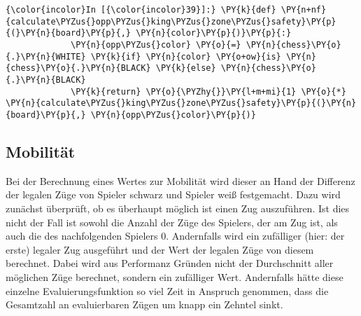     \begin{Verbatim}[commandchars=\\\{\}]
{\color{incolor}In [{\color{incolor}39}]:} \PY{k}{def} \PY{n+nf}{calculate\PYZus{}opp\PYZus{}king\PYZus{}zone\PYZus{}safety}\PY{p}{(}\PY{n}{board}\PY{p}{,} \PY{n}{color}\PY{p}{)}\PY{p}{:}
             \PY{n}{opp\PYZus{}color} \PY{o}{=} \PY{n}{chess}\PY{o}{.}\PY{n}{WHITE} \PY{k}{if} \PY{n}{color} \PY{o+ow}{is} \PY{n}{chess}\PY{o}{.}\PY{n}{BLACK} \PY{k}{else} \PY{n}{chess}\PY{o}{.}\PY{n}{BLACK}
             \PY{k}{return} \PY{o}{\PYZhy{}}\PY{l+m+mi}{1} \PY{o}{*} \PY{n}{calculate\PYZus{}king\PYZus{}zone\PYZus{}safety}\PY{p}{(}\PY{n}{board}\PY{p}{,} \PY{n}{opp\PYZus{}color}\PY{p}{)}
\end{Verbatim}

    \subsection{Mobilität}\label{mobilituxe4t}

Bei der Berechnung eines Wertes zur Mobilität wird dieser an Hand der
Differenz der legalen Züge von Spieler schwarz und Spieler weiß
festgemacht. Dazu wird zunächst überprüft, ob es überhaupt möglich ist
einen Zug auszuführen. Ist dies nicht der Fall ist sowohl die Anzahl der
Züge des Spielers, der am Zug ist, als auch die des nachfolgenden
Spielers 0. Andernfalls wird ein zufälliger (hier: der erste) legaler
Zug ausgeführt und der Wert der legalen Züge von diesem berechnet. Dabei
wird aus Performanz Gründen nicht der Durchschnitt aller möglichen Züge
berechnet, sondern ein zufälliger Wert. Andernfalls hätte diese einzelne
Evaluierungsfunktion so viel Zeit in Anspruch genommen, dass die
Gesamtzahl an evaluierbaren Zügen um knapp ein Zehntel sinkt.

